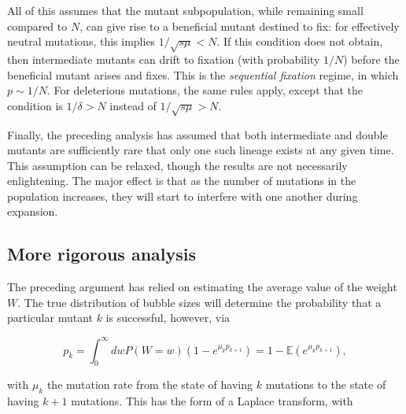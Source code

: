 \documentclass[10pt]{revtex4}
\begin{document}
All of this assumes that the mutant subpopulation, while remaining small compared to $N$, can give rise to a beneficial mutant destined to fix: for effectively neutral mutations, this implies $1/\sqrt{s\mu} < N$.
If this condition does not obtain, then intermediate mutants can drift to fixation (with probability $1/N$) before the beneficial mutant arises and fixes.
This is the \emph{sequential fixation} regime, in which $p \sim 1/N$.
For deleterious mutations, the same rules apply, except that the condition is $1/\delta > N$ instead of $1/\sqrt{s\mu} > N$.

Finally, the preceding analysis has assumed that both intermediate and double mutants are sufficiently rare that only one such lineage exists at any given time. This assumption can be relaxed, though the results are not necessarily enlightening. The major effect is that as the number of mutations in the population increases, they will start to interfere with one another during expansion.

\subsection{More rigorous analysis}

The preceding argument has relied on estimating the average value of the weight $W$.
The true distribution of bubble sizes will determine the probability that a particular mutant $k$ is successful, however, via

\begin{equation}
p_k = \int_0^\infty dw P(W = w) (1-e^{\mu_k p_{k+1}}) = 1-\mathbb{E}(e^{\mu_k p_{k+1}}),
\end{equation}

with $\mu_k$ the mutation rate from the state of having $k$ mutations to the state of having $k+1$ mutations.
This has the form of a Laplace transform, with
\end{document}
